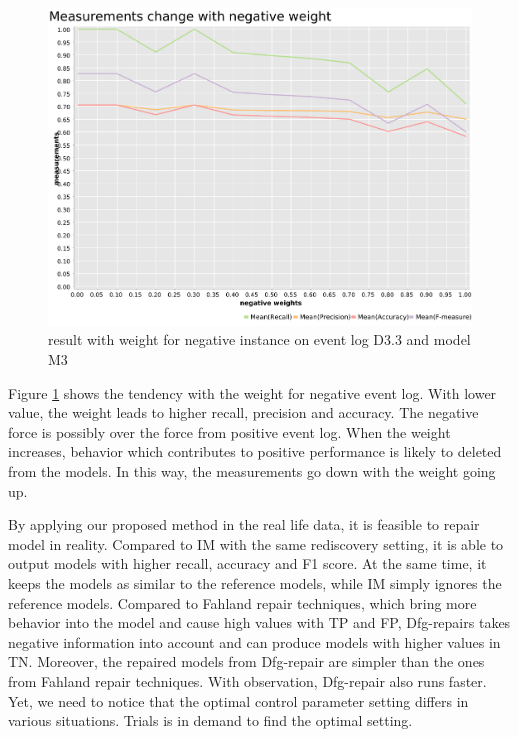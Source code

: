 \begin{figure}[htb]
	\includegraphics[width=\linewidth]{figures/evaluation/M3-D43-neg-weight-plot.pdf}
	\caption{result with weight for negative instance on event log D3.3 and model M3}
	\label{fig:neg-weight}
\end{figure}
Figure \ref{fig:neg-weight} shows the tendency with the weight  for negative event log. With lower value, the weight leads to higher recall, precision and accuracy. The negative force is possibly over the force from positive event log. When the weight increases,  behavior which contributes to positive performance is likely to deleted from the models. In this way, the measurements go down with the weight going up.

By applying our proposed method in the real life data, it is feasible to repair model in reality.   Compared to IM with the same rediscovery setting, it is able to output models with higher recall, accuracy and F1 score. At the same time, it keeps the models as similar to the reference models, while IM simply ignores the reference models. Compared to Fahland repair techniques, which bring more behavior into the model and cause high values with TP and FP, Dfg-repairs takes negative information into account and can produce models with higher values in TN. Moreover, the repaired models from Dfg-repair are simpler than the ones from Fahland repair techniques.  With observation, Dfg-repair also runs faster.  
Yet, we need to notice that the optimal control parameter setting differs in various situations. Trials is in demand to find the optimal setting. 

